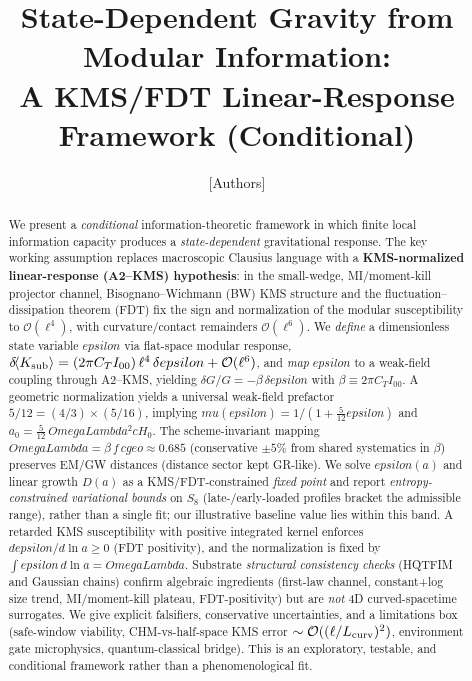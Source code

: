 \documentclass[aps,prd,onecolumn,superscriptaddress,nofootinbib]{revtex4-2}
\def\OmL{OmegaLambda}%
\def\cgeo{cgeo}%
\def\eps{epsilon}%
\def\mu{mu}%
\def\Omega_\Lambda{OmegaLambda}%
\providecommand{\OmL}{\Omega_\Lambda}
\providecommand{\cgeo}{c_{\rm geo}}
\providecommand{\eps}{\varepsilon}
\begin{document}
\title{State-Dependent Gravity from Modular Information:\\
A KMS/FDT Linear-Response Framework (Conditional)}

\author{[Authors]}
\affiliation{[Institutions]}
\date{}

\begin{abstract}
We present a \emph{conditional} information-theoretic framework in which finite local information capacity produces a \emph{state-dependent} gravitational response. The key working assumption replaces macroscopic Clausius language with a \textbf{KMS-normalized linear-response (A2--KMS) hypothesis}: in the small-wedge, MI/moment-kill projector channel, Bisognano--Wichmann (BW) KMS structure and the fluctuation--dissipation theorem (FDT) fix the sign and normalization of the modular susceptibility to \(\mathcal O(\ell^4)\), with curvature/contact remainders \(\mathcal O(\ell^6)\). We \emph{define} a dimensionless state variable \(\eps\) via flat-space modular response, \(\delta\!\langle K_{\rm sub}\rangle=(2\pi C_T I_{00})\,\ell^4\,\delta\eps+\mathcal O(\ell^6)\), and \emph{map} \(\eps\) to a weak-field coupling through A2--KMS, yielding \(\delta G/G=-\beta\,\delta\eps\) with \(\beta\equiv 2\pi C_T I_{00}\). A geometric normalization yields a universal weak-field prefactor \(5/12=(4/3)\times(5/16)\), implying \(\mu(\eps)=1/(1+\tfrac{5}{12}\eps)\) and \(a_0=\tfrac{5}{12}\,\OmL^2 cH_0\). The scheme-invariant mapping \(\OmL=\beta\,f\,\cgeo\approx 0.685\) (conservative \(\pm 5\%\) from shared systematics in \(\beta\)) preserves EM/GW distances (distance sector kept GR-like). We solve \(\eps(a)\) and linear growth \(D(a)\) as a KMS/FDT-constrained \emph{fixed point} and report \emph{entropy-constrained variational bounds} on \(S_8\) (late-/early-loaded profiles bracket the admissible range), rather than a single fit; our illustrative baseline value lies within this band. A retarded KMS susceptibility with positive integrated kernel enforces \(d\eps/d\ln a\ge 0\) (FDT positivity), and the normalization is fixed by \(\int \eps\,d\ln a=\OmL\). Substrate \emph{structural consistency checks} (HQTFIM and Gaussian chains) confirm algebraic ingredients (first-law channel, constant+log size trend, MI/moment-kill plateau, FDT-positivity) but are \emph{not} 4D curved-spacetime surrogates. We give explicit falsifiers, conservative uncertainties, and a limitations box (safe-window viability, CHM-vs-half-space KMS error \(\sim \mathcal O((\ell/L_{\rm curv})^2)\), environment gate micro\-physics, quantum-classical bridge). This is an exploratory, testable, and conditional framework rather than a phenomenological fit.
\end{abstract}
\end{document}
